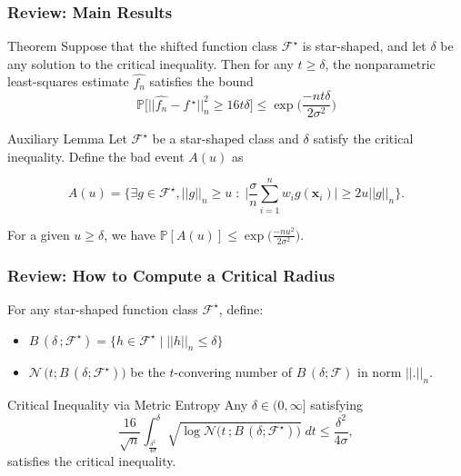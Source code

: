 \documentclass[11pt]{beamer}
\newcommand{\Prob}{\mathbb{P}}
\newcommand{\bx}{\mathbf{x}}
\newcommand{\cF}{\mathcal{F}}
\newcommand{\fstar}{f\,^\star}
\begin{document}
	\begin{frame}
		\frametitle{Review: Main Results}
		\begin{block}{Theorem}
			Suppose that the shifted function class $\cF^\star$ is star-shaped, and let $\delta$ be any solution to the critical inequality. Then for any $t \geq \delta$, the nonparametric least-squares estimate $\widehat{f_n}$ satisfies the bound
			\begin{equation*}
			\Prob\big[||\widehat{f_n} - \fstar ||_n^2 \geq 16t\delta\big] \leq \exp\Big(\frac{-nt\delta}{2\sigma^2}\Big)
			\end{equation*}
		\end{block}
		\begin{block}{Auxiliary Lemma}
			Let $\cF^\star$ be a star-shaped class and $\delta$ satisfy the critical inequality.  Define the bad event $A(u)$ as
			\begin{small}
				
				\vspace{-0.3cm}
				\begin{equation*}
				A(u) = \Bigg\{\exists g \in \cF^\star, ||g||_n \geq u \;:\; \Big|\frac{\sigma}{n}\sum_{i = 1}^{n} w_i g(\bx_i)\Big|\geq 2u ||g||_n\Bigg\}.
				\end{equation*}
			\end{small}
			\vspace{-0.3cm}
			
			For a given $u \geq \delta$, we have 
			$\Prob[A(u)]\leq \exp\big(\frac{-nu^2}{2\sigma^2}\big)$.
		\end{block}
	\end{frame}	

	\begin{frame}
		\frametitle{Review: How to Compute a Critical Radius}
		For any star-shaped function class $\cF^\star$, define:
		\begin{itemize}
			\item $B\,(\delta\,; \cF^\star) = \{h\in \cF^\star \;\big|\; ||h||_n\leq \delta\}$
			\item $\mathcal{N}\,\big(t; B\,(\delta; \cF^\star)\big)$ be the $t$-convering number of $B\,(\delta; \cF)$ in norm $||.||_n$.
		\end{itemize}
		\begin{block}{Critical Inequality via Metric Entropy}
			Any $\delta \in (0, \infty]$ satisfying
			\begin{equation*}
			\frac{16}{\sqrt{n}} \int_{\frac{\delta^2}{4\sigma}}^{\delta} \sqrt{\log \mathcal{N}\big(t\,; B\,(\delta; \cF^\star)\big)} \;dt \leq \frac{\delta^2}{4\sigma},
			\end{equation*}
			satisfies the critical inequality.
		\end{block}
	\end{frame}
\end{document}
